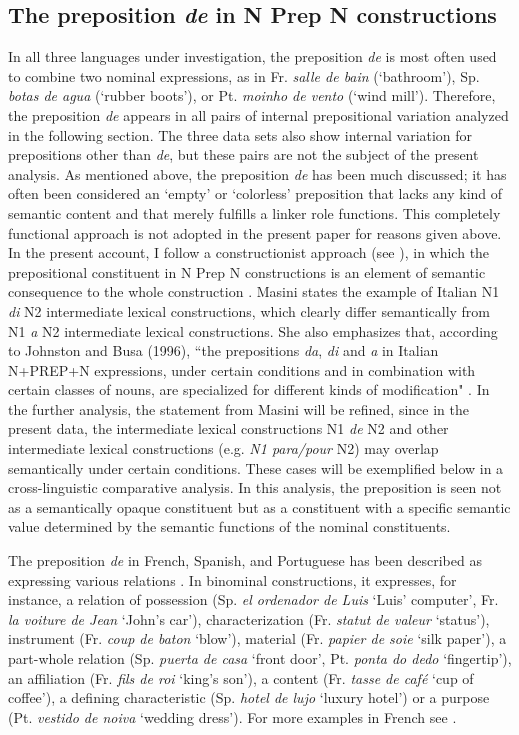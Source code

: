 \documentclass[output=paper]{langsci/langscibook}
\begin{document}
\subsection{The preposition \textit{de} in N Prep N constructions}
In all three languages under investigation, the preposition \textit{de} is most often used to combine two nominal expressions, as in Fr. \textit{salle de bain}  (`bathroom'), Sp. \textit{botas de agua} (`rubber boots'), or Pt. \textit{moinho de vento} (`wind mill'). Therefore, the preposition \textit{de} appears in all pairs of internal prepositional variation analyzed in the following section. The three data sets also show internal variation for prepositions other than \textit{de}, but these pairs are not the subject of the present analysis. As mentioned above, the preposition \textit{de} has been much discussed; it has often been considered an `empty' or `colorless' preposition that lacks any kind of semantic content and that merely fulfills a linker role functions. This completely functional approach is not adopted in the present paper for reasons given above.
In the present account, I follow a constructionist approach (see \citealt{Masini:2009}), in which the prepositional constituent in N Prep N constructions is an element of semantic consequence to the whole construction \citep[262]{Masini:2009}. Masini states the example of Italian N1 \textit{di} N2 intermediate lexical constructions, which clearly differ semantically from N1 \textit{a} N2 intermediate lexical constructions. She also emphasizes that, according to Johnston and Busa (1996), ``the prepositions \textit{da}, \textit{di} and \textit{a} in Italian N+PREP+N expressions, under certain conditions and in combination with certain classes of nouns, are specialized for different kinds of modification" \citep[262]{Masini:2009}. In the further analysis, the statement from Masini will be refined, since in the present data, the intermediate lexical constructions N1 \textit{de} N2 and other intermediate lexical constructions (e.g. \textit{N1 para/pour} N2) may overlap semantically under certain conditions. These cases will be exemplified below in a cross-linguistic comparative analysis. In this analysis, the preposition is seen not as a semantically opaque constituent but as a constituent with a specific semantic value determined by the semantic functions of the nominal constituents.

The preposition \textit{de} in French, Spanish, and Portuguese has been described as expressing various relations \citep[187]{Bartning:1993}. In binominal constructions, it expresses, for instance, a relation of possession (Sp. \textit{el ordenador de Luis} `Luis' computer', Fr. \textit{la voiture de Jean} `John’s car'), characterization (Fr. \textit{statut de valeur} `status'), instrument (Fr. \textit{coup de baton} `blow'), material (Fr. \textit{papier de soie} `silk paper'), a part-whole relation (Sp. \textit{puerta de casa} `front door', Pt. \textit{ponta do dedo} `fingertip'), an affiliation (Fr. \textit{fils de roi} ‘king’s son’), a content (Fr. \textit{tasse de café} `cup of coffee'), a defining characteristic (Sp. \textit{hotel de lujo} `luxury hotel') or a purpose (Pt. \textit{vestido de noiva} `wedding dress'). For more examples in French see \citep[291 ff.]{Lang:1991}.
\end{document}
